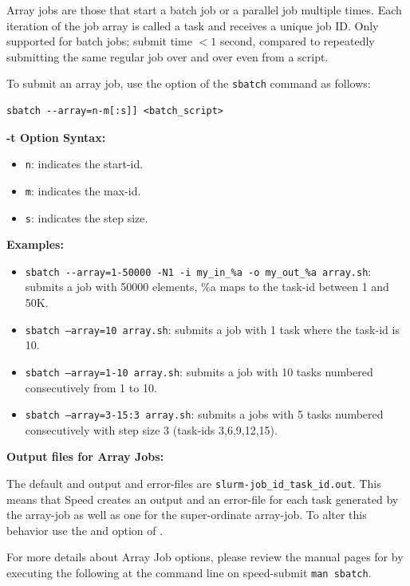 Array jobs are those that start a batch job or a parallel job multiple times. 
Each iteration of the job array is called a task and receives a unique job ID.
Only supported for batch jobs; submit time $< 1$ second, compared to repeatedly
submitting the same regular job over and over even from a script.

To submit an array job, use the  option of the \texttt{sbatch} 
command as follows:

\begin{verbatim}
sbatch --array=n-m[:s]] <batch_script>
\end{verbatim}

\textbf{-t Option Syntax:}
\begin{itemize}
\item
\texttt{n}: indicates the start-id.
\item
\texttt{m}: indicates the max-id.
\item
\texttt{s}: indicates the step size.
\end{itemize}

\textbf{Examples:}
\begin{itemize}
\item
\verb+sbatch --array=1-50000 -N1 -i my_in_%a -o my_out_%a array.sh+: submits a job with 50000 elements,
\%a maps to the task-id between 1 and 50K. 
\item
\texttt{sbatch --array=10 array.sh}: submits a job with 1 task where the task-id is 10. 
\item
\texttt{sbatch --array=1-10 array.sh}: submits a job with 10 tasks numbered consecutively from 1 to 10.
\item
\texttt{sbatch --array=3-15:3 array.sh}: submits a jobs with 5 tasks numbered consecutively with step size 3
(task-ids 3,6,9,12,15).
\end{itemize}

\textbf{Output files for Array Jobs:}

The default and output and error-files are
\texttt{slurm-job\_id\_task\_id.out}.
%
This means that Speed creates an output and an error-file for each task 
generated by the array-job as well as one for the super-ordinate array-job. 
To alter this behavior use the  and  option of
. 

For more details about Array Job options, please review the manual pages for 
 by executing the following at the command line on speed-submit 
\texttt{man sbatch}.
